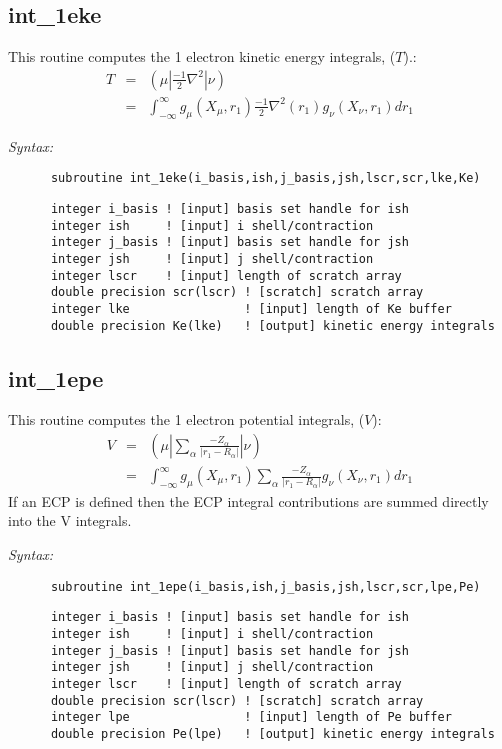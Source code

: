 \subsection{int\_1eke} 
This routine computes the 1 electron kinetic energy integrals, ($T$).: 
\begin{eqnarray*} 
T & = & ({\mu}|\frac{-1}{2}\nabla^{2}|{\nu}) \\ 
  & = & \int_{-\infty}^{\infty}g_{\mu}(X_{\mu},r_{1})\frac{-1}{2}\nabla^{2}(r_{1})g_{\nu}(X_{\nu},r_{1})dr_{1} 
\end{eqnarray*} 
 
{\it Syntax:} 
\begin{verbatim} 
      subroutine int_1eke(i_basis,ish,j_basis,jsh,lscr,scr,lke,Ke) 
\end{verbatim} 
\begin{verbatim} 
      integer i_basis ! [input] basis set handle for ish 
      integer ish     ! [input] i shell/contraction 
      integer j_basis ! [input] basis set handle for jsh 
      integer jsh     ! [input] j shell/contraction 
      integer lscr    ! [input] length of scratch array 
      double precision scr(lscr) ! [scratch] scratch array 
      integer lke                ! [input] length of Ke buffer 
      double precision Ke(lke)   ! [output] kinetic energy integrals 
\end{verbatim} 
\subsection{int\_1epe} 
This routine computes the 1 electron potential integrals, ($V$): 
\begin{eqnarray*} 
V & = & ({\mu}|\sum_{\alpha}\frac{-Z_{\alpha}}{|r_{1}-R_{\alpha}|}|{\nu}) \\ 
  & = & \int_{-\infty}^{\infty} g_{\mu}(X_{\mu},r_{1})\sum_{\alpha}\frac 
{-Z_{\alpha}}{|r_{1}-R_{\alpha}|}g_{\nu}(X_{\nu},r_{1})dr_{1} 
\end{eqnarray*} 
If an ECP is defined then the ECP integral contributions are summed 
directly into the V integrals. 
 
{\it Syntax:} 
\begin{verbatim} 
      subroutine int_1epe(i_basis,ish,j_basis,jsh,lscr,scr,lpe,Pe) 
\end{verbatim} 
\begin{verbatim} 
      integer i_basis ! [input] basis set handle for ish 
      integer ish     ! [input] i shell/contraction 
      integer j_basis ! [input] basis set handle for jsh 
      integer jsh     ! [input] j shell/contraction 
      integer lscr    ! [input] length of scratch array 
      double precision scr(lscr) ! [scratch] scratch array 
      integer lpe                ! [input] length of Pe buffer 
      double precision Pe(lpe)   ! [output] kinetic energy integrals 
\end{verbatim} 
